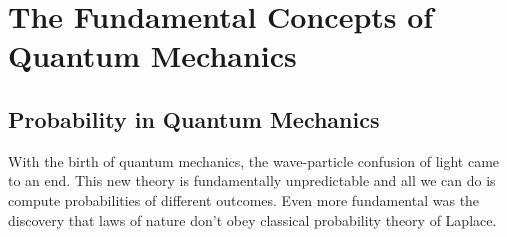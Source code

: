 \documentclass[a4paper, 12pt]{article}
\begin{document}
\section {{\large{\textbf{The Fundamental Concepts of Quantum Mechanics}}}}

\subsection {Probability in Quantum Mechanics}

With the birth of quantum mechanics, the wave-particle confusion of light came to an end. This new theory is fundamentally unpredictable and all we can do is compute probabilities of different outcomes. Even more fundamental was the discovery that laws of nature don't obey classical probability theory of Laplace.
\end{document}

